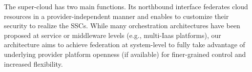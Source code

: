 \documentclass{sig-alternate}
\begin{document}
The super-cloud has two main functions.
Its northbound interface federates cloud resources in a provider-independent manner and enables to customize their security to realize the SSCs. While many orchestration architectures have been proposed at service or middleware levels (e.g., multi-Iaas platforms), our architecture aims to achieve federation at system-level to fully take advantage of underlying provider platform openness (if available) for finer-grained control and increased flexibility.

\end{document}
